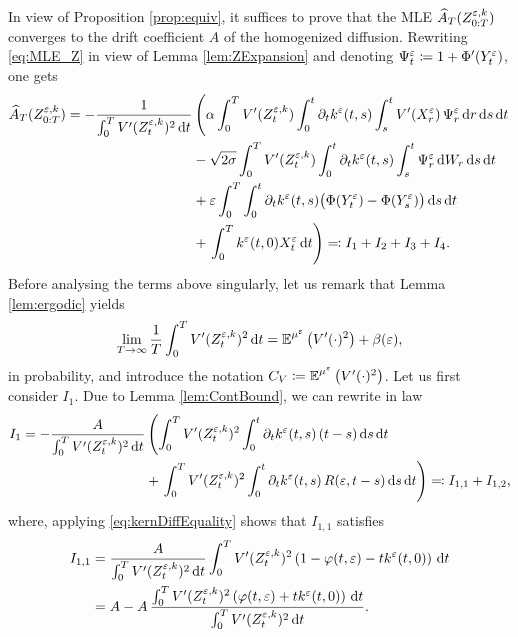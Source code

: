 \documentclass[10pt]{article}
\begin{document}
In view of Proposition \ref{prop:equiv}, it suffices to prove that the MLE $\widehat A_T (Z^{\varepsilon,k}_{0:T})$ converges to the drift coefficient $A$ of the homogenized diffusion. Rewriting \eqref{eq:MLE_Z} in view of Lemma \ref{lem:ZExpansion} and denoting $\Psi^\varepsilon_t \coloneqq 1 + \Phi'(Y_t^\varepsilon)$, one gets
\begin{equation}
\begin{aligned}
	 \widehat A_T (Z^{\varepsilon,k}_{0:T}) = -\frac{1}{\int_0^T V'(Z^{\varepsilon,k}_t)^2 \,\mathrm{d} t} &\left(\alpha \int_0^T V'(Z^{\varepsilon,k}_t) \int_0^t \partial_t k^\varepsilon(t, s) \int_s^t  V'(X^\varepsilon_r)\, \Psi^\varepsilon_r\,\mathrm{d} r \,\mathrm{d} s \,\mathrm{d} t\right.\\
	 &-\sqrt{2\sigma} \int_0^T V'(Z^{\varepsilon,k}_t) \int_0^t \partial_t k^\varepsilon(t, s)  \int_s^t \Psi^\varepsilon_r \,\mathrm{d} W_r \,\mathrm{d} s \,\mathrm{d} t\\
	 &+\varepsilon \int_0^T \int_0^t \partial_t k^\varepsilon(t, s) \big(\Phi(Y^\varepsilon_t)- \Phi(Y^\varepsilon_s)\big) \,\mathrm{d} s \,\mathrm{d} t\\
	 &+ \left. \int_0^T k^\varepsilon(t, 0) X^\varepsilon_t \,\mathrm{d} t \right) \eqqcolon I_1 + I_2 + I_3 + I_4.
\end{aligned}
\end{equation}
Before analysing the terms above singularly, let us remark that Lemma \ref{lem:ergodic} yields
\begin{equation}
	 \lim_{T\to\infty} \frac1T \int_0^T V'(Z^{\varepsilon,k}_t)^2 \,\mathrm{d} t = \operatorname{\mathbb{E}}^{\mu^\varepsilon} \left(V'(\cdot)^2\right) + \beta(\varepsilon),
\end{equation}
in probability, and introduce the notation $ C_V \coloneqq \operatorname{\mathbb{E}}^{\mu^\varepsilon} \left(V'(\cdot)^2\right)$.
Let us first consider $I_1$. Due to Lemma \ref{lem:ContBound}, we can rewrite in law
\begin{equation}
\begin{aligned}
	I_1 = -\frac{A}{\int_0^T V'(Z^{\varepsilon,k}_t)^2 \,\mathrm{d} t} &\left(\int_0^T V'(Z^{\varepsilon,k}_t)^2 \int_0^t \partial_t k^\varepsilon(t, s) \, (t - s) \,\mathrm{d} s \,\mathrm{d} t \right. \\
	&+ \left. \int_0^T V'(Z^{\varepsilon,k}_t)^2 \int_0^t \partial_t k^\varepsilon(t, s) \, R(\varepsilon, t-s) \,\mathrm{d} s \,\mathrm{d} t \right) \eqqcolon I_{1,1} + I_{1,2},
\end{aligned}
\end{equation}
where, applying \eqref{eq:kernDiffEquality} shows that $I_{1,1}$ satisfies
\begin{equation}
\begin{aligned}
	I_{1,1} &= \frac{A}{\int_0^T V'(Z^{\varepsilon,k}_t)^2 \,\mathrm{d} t} \int_0^T V'(Z^{\varepsilon,k}_t)^2 \left(1 - \varphi(t, \varepsilon) - t k^\varepsilon(t, 0) \right) \,\mathrm{d} t\\
	&= A - A \, \frac{\int_0^T V'(Z^{\varepsilon,k}_t)^2 \left(\varphi(t, \varepsilon) + t k^\varepsilon(t, 0) \right) \,\mathrm{d} t}{\int_0^T V'(Z^{\varepsilon,k}_t)^2 \,\mathrm{d} t}.
\end{aligned}
\end{equation}
\end{document}
